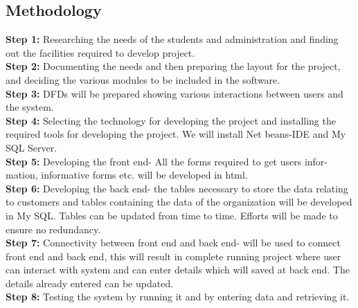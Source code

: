 \subsection{Methodology}
\textbf{Step 1:} Researching the needs of the students and administration and finding
out the facilities required to develop project.\\
\textbf{Step 2:} Documenting the needs and then preparing the layout for the project,
and deciding the various modules to be included in the software.\\
\textbf{Step 3:} DFDs will be prepared showing various interactions between users
and the system.\\
\textbf{Step 4:} Selecting the technology for developing the project and installing the
required tools for developing the project. We will install Net beans-IDE and
My SQL Server.\\
\textbf{Step 5:} Developing the front end- All the forms required to get users infor-
mation, informative forms etc. will be developed in html.\\
\textbf{Step 6:} Developing the back end- the tables necessary to store the data relating to customers and tables containing the data of the organization will be developed in My SQL. Tables can be updated from time to time. Efforts will be made to ensure no redundancy.\\
\textbf{Step 7:} Connectivity between front end and back end- will be used to connect
front end and back end, this will result in complete running project where user
can interact with system and can enter details which will saved at back end.
The details already entered can be updated.\\
\textbf{Step 8:} Testing the system by running it and by entering data and retrieving
it.\\






